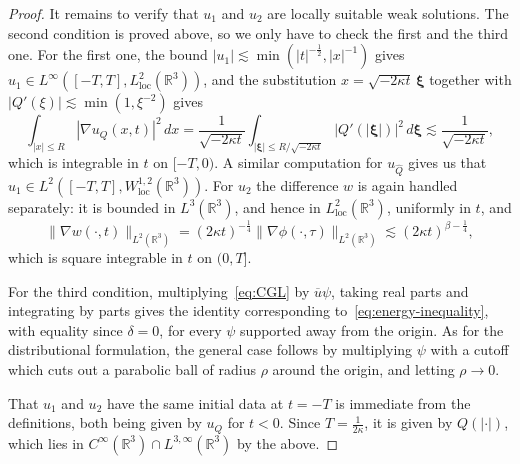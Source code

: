 \documentclass[10pt,a4paper]{amsart}
\newcommand{\conj}[1]{\overline{#1}}
\begin{document}
\begin{proof}
  It remains to verify that \(u_{1}\) and \(u_{2}\) are locally
  suitable weak solutions. The second condition is proved above, so we
  only have to check the first and the third one. For the first one,
  the bound \(|u_{1}| \lesssim \min(|t|^{-\frac{1}{2}}, |x|^{-1})\)
  gives
  \(u_{1} \in L^{\infty}([-T, T],
  L_{\text{loc}}^{2}(\mathbb{R}^{3}))\), and the substitution
  \(x = \sqrt{-2\kappa t}\,\bm{\xi}\) together with
  \(|Q'(\xi)| \lesssim \min(1, \xi^{-2})\) gives
  \begin{equation*}
    \int_{|x| \leq R} |\nabla u_{Q}(x, t)|^{2}\,dx
    = \frac{1}{\sqrt{-2\kappa t}}
    \int_{|\bm{\xi}| \leq R / \sqrt{-2\kappa t}} |Q'(|\bm{\xi}|)|^{2}\,d\bm{\xi}
    \lesssim \frac{1}{\sqrt{-2\kappa t}},
  \end{equation*}
  which is integrable in \(t\) on \([-T, 0)\). A similar computation
  for \(u_{\hat{Q}}\) gives us that
  \(u_{1} \in L^{2}([-T, T], W_{\text{loc}}^{1,2}(\mathbb{R}^{3}))\).
  For \(u_{2}\) the difference \(w\) is again handled separately: it
  is bounded in \(L^{3}(\mathbb{R}^{3})\), and hence in
  \(L_{\text{loc}}^{2}(\mathbb{R}^{3})\), uniformly in \(t\), and
  \begin{equation*}
    \|\nabla w(\cdot, t)\|_{L^{2}(\mathbb{R}^{3})}
    = (2\kappa t)^{-\frac{1}{4}}\|\nabla \phi(\cdot, \tau)\|_{L^{2}(\mathbb{R}^{3})}
    \lesssim (2\kappa t)^{\beta - \frac{1}{4}},
  \end{equation*}
  which is square integrable in \(t\) on \((0, T]\).

  For the third condition, multiplying~\eqref{eq:CGL} by
  \(\conj{u}\psi\), taking real parts and integrating by parts gives
  the identity corresponding to~\eqref{eq:energy-inequality}, with
  equality since \(\delta = 0\), for every \(\psi\) supported away
  from the origin. As for the distributional formulation, the general
  case follows by multiplying \(\psi\) with a cutoff which cuts out a
  parabolic ball of radius \(\rho\) around the origin, and letting
  \(\rho \to 0\).

  That \(u_{1}\) and \(u_{2}\) have the same initial data at
  \(t = -T\) is immediate from the definitions, both being given by
  \(u_{Q}\) for \(t < 0\). Since \(T = \frac{1}{2\kappa}\), it is
  given by \(Q(|\cdot|)\), which lies in
  \(C^{\infty}(\mathbb{R}^{3}) \cap L^{3,\infty}(\mathbb{R}^{3})\) by
  the above.


\end{proof}
\end{document}
